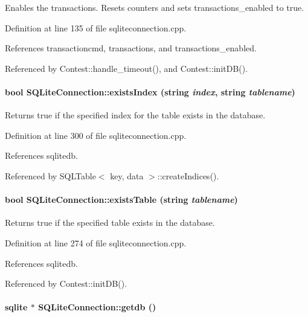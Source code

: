 Enables the transactions. Resets counters and sets transactions\_\-enabled to true. 

Definition at line 135 of file sqliteconnection.cpp.

References transactioncmd, transactions, and transactions\_\-enabled.

Referenced by Contest::handle\_\-timeout(), and Contest::init\-DB().\hypertarget{classSQLiteConnection_SQLiteConnectiona13}{
\paragraph[existsIndex]{\setlength{\rightskip}{0pt plus 5cm}bool SQLite\-Connection::exists\-Index (string {\em index}, string {\em tablename})}\hfill}
\label{classSQLiteConnection_SQLiteConnectiona13}


Returns true if the specified index for the table exists in the database. 

Definition at line 300 of file sqliteconnection.cpp.

References sqlitedb.

Referenced by SQLTable$<$ key, data $>$::create\-Indices().\hypertarget{classSQLiteConnection_SQLiteConnectiona12}{
\paragraph[existsTable]{\setlength{\rightskip}{0pt plus 5cm}bool SQLite\-Connection::exists\-Table (string {\em tablename})}\hfill}
\label{classSQLiteConnection_SQLiteConnectiona12}


Returns true if the specified table exists in the database. 

Definition at line 274 of file sqliteconnection.cpp.

References sqlitedb.

Referenced by Contest::init\-DB().\hypertarget{classSQLiteConnection_SQLiteConnectiona3}{
\paragraph[getdb]{\setlength{\rightskip}{0pt plus 5cm}sqlite $\ast$ SQLite\-Connection::getdb ()}\hfill}
\label{classSQLiteConnection_SQLiteConnectiona3}


